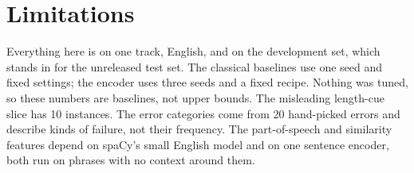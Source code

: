 \section*{Limitations}

Everything here is on one track, English, and on the development set, which stands in for the unreleased test set. The classical baselines use one seed and fixed settings; the encoder uses three seeds and a fixed recipe. Nothing was tuned, so these numbers are baselines, not upper bounds. The misleading length-cue slice has 10 instances. The error categories come from 20 hand-picked errors and describe kinds of failure, not their frequency. The part-of-speech and similarity features depend on spaCy's small English model and on one sentence encoder, both run on phrases with no context around them.

